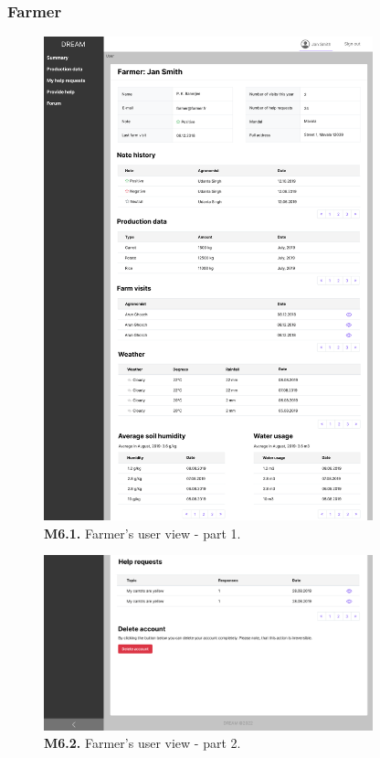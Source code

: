 \subsubsection{Farmer}


\begin{figure}[H]
    \centering
    \includegraphics[width=0.85\textwidth]{mockups/Farmer_User_part1.png}
    \caption{\textbf{M6.1.} Farmer's user view - part 1.}
\end{figure}

\begin{figure}[H]
    \centering
    \includegraphics[width=0.85\textwidth]{mockups/Farmer_User_part2.png}
    \caption{\textbf{M6.2.} Farmer's user view - part 2.}
\end{figure}

